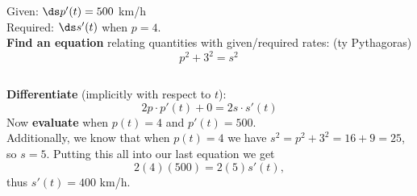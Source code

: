 \begin{frame}
\begin{example}
\begin{columns}[c]
 
 Given:      $\ds p'(t)= 500$ km/h  \\
 Required: $ \ds s'(t) $ when $ p=4.$ \pause \\
\textbf{Find an equation}  relating quantities with given/required rates:  \pause (ty Pythagoras)
\[
p^2+3^2=s^2
\]   \pause 
\end{columns}


\textbf{Differentiate} (implicitly with respect to $ t $):
\[
2p\cdot p'(t)+ 0 =2s\cdot s'(t)
\]
\pause 
Now \textbf{evaluate} when  $p(t)=4$ and $p'(t) =
500$.\\ \pause 
Additionally, we know that when $ p(t)=4 $ we have  $s^2=p^2+3^2=16+9=25$, so
$s=5$.  \pause 
Putting this all into our last equation we get
\[
2(4)(500)=2(5)s'(t),
\]
thus $s'(t)=400$ km/h.
\end{example}
\end{frame}

